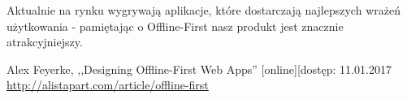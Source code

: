 \documentclass[a4paper, 12pt]{article}
\begin{document}
Aktualnie na rynku wygrywają aplikacje, które dostarczają najlepszych wrażeń użytkowania - pamiętając o Offline-First nasz produkt jest znacznie atrakcyjniejszy. \vspace{1cm}\\

\begin{thebibliography}{1}

 {Alex Feyerke, ,,Designing Offline-First Web Apps'' [online][dostęp: 11.01.2017 \url{http://alistapart.com/article/offline-first}}

\end{thebibliography}
\end{document}
